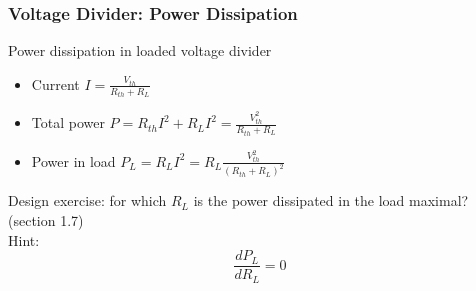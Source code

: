 \documentclass[beamer]{standalone}
\begin{document}
\begin{frame}
 \frametitle{Voltage Divider: Power Dissipation}
 \begin{block}{Power dissipation in loaded voltage divider}
  \begin{itemize}
   \item Current $I = \frac{V_{th}}{R_{th} + R_{L}}$
   \item Total power $P = R_{th} I^2 + R_{L} I^2 = \frac{V_{th}^2}{R_{th} + R_{L}}$
   \item Power in load $P_L = R_{L} I^2 = R_{L}  \frac{V_{th}^2}{(R_{th} + R_{L})^2}$
  \end{itemize}
 \end{block}
 Design exercise: for which $R_L$ is the power dissipated in the load maximal? (section 1.7)
 \\
 Hint:
 \begin{equation*}
  \frac{d P_L}{d R_L} = 0
 \end{equation*}
\end{frame}
\end{document}
